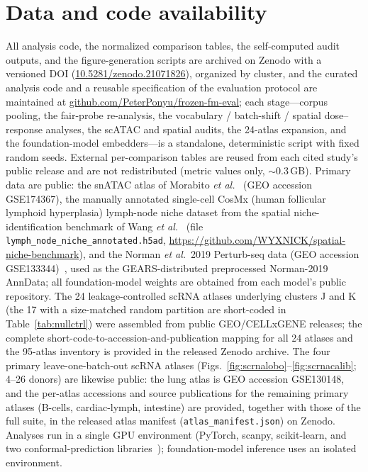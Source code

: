 \documentclass[11pt]{article}
\begin{document}
\section*{Data and code availability}
All analysis code, the normalized comparison tables, the self-computed audit outputs, and the figure-generation scripts are archived on Zenodo with a versioned DOI (\href{https://doi.org/10.5281/zenodo.21071826}{10.5281/zenodo.21071826}), organized by cluster, and the curated analysis code and a reusable specification of the evaluation protocol are maintained at \href{https://github.com/PeterPonyu/frozen-fm-eval}{github.com/PeterPonyu/frozen-fm-eval}; each stage---corpus pooling, the fair-probe re-analysis, the vocabulary / batch-shift / spatial dose--response analyses, the scATAC and spatial audits, the 24-atlas expansion, and the foundation-model embedders---is a standalone, deterministic script with fixed random seeds. External per-comparison tables are reused from each cited study's public release and are not redistributed (metric values only, $\sim$0.3\,GB). Primary data are public: the snATAC atlas of Morabito \emph{et al.}~\cite{morabito2021} (GEO accession GSE174367), the manually annotated single-cell CosMx (human follicular lymphoid hyperplasia) lymph-node niche dataset from the spatial niche-identification benchmark of Wang \emph{et al.}~\cite{wang2026niche} (file \texttt{lymph\_node\_niche\_annotated.h5ad}, \url{https://github.com/WYXNICK/spatial-niche-benchmark}), and the Norman \emph{et al.}\ 2019 Perturb-seq data (GEO accession GSE133344)~\cite{norman2019}, used as the GEARS-distributed preprocessed Norman-2019 AnnData; all foundation-model weights are obtained from each model's public repository. The 24 leakage-controlled scRNA atlases underlying clusters J and K (the 17 with a size-matched random partition are short-coded in Table~\ref{tab:nullctrl}) were assembled from public GEO/CELLxGENE releases; the complete short-code-to-accession-and-publication mapping for all 24 atlases and the 95-atlas inventory is provided in the released Zenodo archive. The four primary leave-one-batch-out scRNA atlases (Figs.~\ref{fig:scrnalobo}--\ref{fig:scrnacalib}; 4--26 donors) are likewise public: the lung atlas is GEO accession GSE130148, and the per-atlas accessions and source publications for the remaining primary atlases (B-cells, cardiac-lymph, intestine) are provided, together with those of the full suite, in the released atlas manifest (\texttt{atlas\_manifest.json}) on Zenodo. Analyses run in a single GPU environment (PyTorch, scanpy, scikit-learn, and two conformal-prediction libraries~\cite{crepes,mapie}); foundation-model inference uses an isolated environment.
\end{document}
